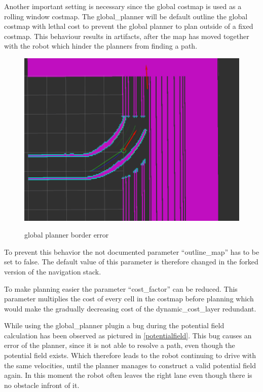 Another important setting is necessary since the global costmap is used as a rolling window costmap. The global\_planner will be default outline the global costmap with lethal cost to prevent the global planner to plan outside of a fixed costmap. This behaviour results in artifacts, after the map has moved together with the robot which hinder the planners from finding a path.

\begin{figure}[H]
	\centering
	\includegraphics[width=\textwidth]{Pictures/borders}
	\label{boardererror}
	\caption{global planner border error}
\end{figure}

To prevent this behavior the not documented parameter ``outline\_map'' has to be set to false. The default value of this parameter is therefore changed in the forked version of the navigation stack.

To make planning easier the parameter ``cost\_factor'' can be reduced. This parameter multiplies the cost of every cell in the costmap before planning which
 would make the gradually decreasing cost of the dynamic\_cost\_layer redundant.
 
 
 While using the global\_planner plugin a bug during the potential field calculation has been observed as pictured in \ref{potentialfield}. This bug causes an error of the planner, since it is not able to resolve a path, even though the potential field exists. Which therefore leads to the robot continuing to drive with the same velocities,  until the planner manages to construct a valid potential field again. In this moment the robot often leaves the right lane even though there is no obstacle infront of it.
 
